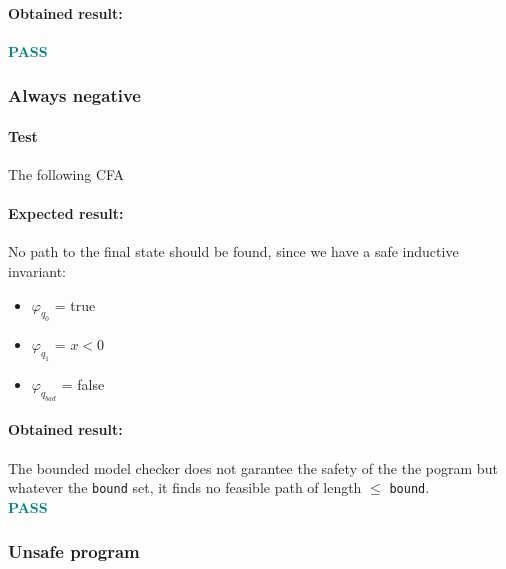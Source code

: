 \documentclass[letterpaper,12pt]{article}
\begin{document}
\paragraph{Obtained result:}
\textbf{\textcolor{teal}{PASS}}

  
\subsubsection{Always negative}

\paragraph{Test} The following CFA


\paragraph{Expected result:}
No path to the final state should be found, since we have a safe inductive invariant:
\begin{itemize}
\item $\varphi _{q_0}$ = true
\item $\varphi _{q_1}$ = $ x < 0$
\item $\varphi _{q_{bad}}$ = false
\end{itemize}
\paragraph{Obtained result:}
The bounded model checker does not garantee the safety of the the pogram but whatever the \texttt{bound} set, it finds no feasible path of length $\leq$ \texttt{bound}.\\
\textbf{\textcolor{teal}{PASS}}

\subsubsection{Unsafe program}
\end{document}
